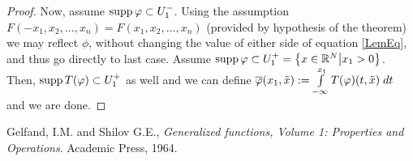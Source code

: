 \documentclass[10pt]{article} %
\begin{document}
\begin{proof}
		Now, assume $\operatorname{supp}\varphi\subset U_{1}^-$. Using the assumption $F(-x_1,x_2,\hdots,x_n)=F(x_1,x_2,\hdots,x_n)$ (provided
		by hypothesis of the theorem) we may reflect $\phi$, without changing the value of either side of equation \ref{LemEq},
		and thus go directly to last case. Assume
		$\operatorname{supp}\varphi\subset U_{1}^+=\left\{x\in\mathbb{R}^N\big| x_1 >0\right\}$. Then, $\operatorname{supp} T(\varphi)\subset U_{1}^+$ as well and we can define
		$\overline{\phi}(x_1,\tx):=\int_{-\infty}^{x_1}T(\phi)(t,\tx)\;dt$ and we are done.
	\end{proof}
\begin{thebibliography}{9}
Gelfand, I.M. and Shilov G.E., {\em Generalized functions, Volume 1:
 Properties and Operations}. Academic Press, 1964.
\end{thebibliography}
\end{document}
